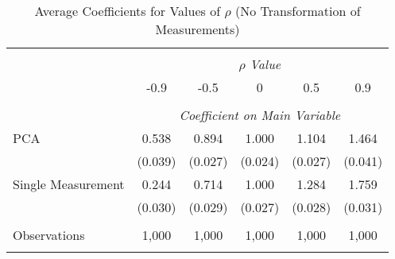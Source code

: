 \begin{table}[!htbp] \centering
  \caption{Average Coefficients for Values of $\rho$ (No Transformation of Measurements) \label{sim_rho_2_noexp}}
\begin{tabular}{@{\extracolsep{5pt}}lccccc}
\\[-1.8ex]\hline
\hline \\[-1.8ex]
& \multicolumn{5}{c}{$\rho$ \textit{ Value}} \
\cr \
\\[-1.8ex] & -0.9 & -0.5 & 0 & 0.5 & 0.9 \\
\hline \\[-1.8ex]
& \multicolumn{5}{c}{\textit{Coefficient on Main Variable}} \\
 PCA & 0.538 & 0.894 & 1.000 & 1.104 & 1.464  \\
  & (0.039) & (0.027) & (0.024) & (0.027) & (0.041)\\
  Single Measurement & 0.244 & 0.714 & 1.000 & 1.284 & 1.759  \\
  & (0.030) & (0.029) & (0.027) & (0.028) & (0.031)\\
\hline \\[-1.8ex]
 Observations & 1,000 & 1,000 & 1,000 & 1,000 & 1,000\\
\hline
\hline \\[-1.8ex]
\end{tabular}
\end{table}

